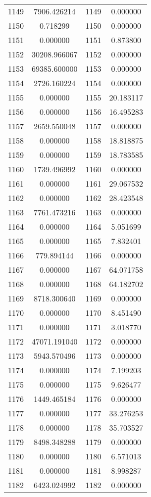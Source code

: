 \documentclass[12pt]{article}
\begin{document}
\begin{longtable}{@{}cccc@{}}
1149 & 7906.426214 & 1149 & 0.000000 \\
1150 & 0.718299 & 1150 & 0.000000 \\
1151 & 0.000000 & 1151 & 0.873800 \\
1152 & 30208.966067 & 1152 & 0.000000 \\
1153 & 69385.600000 & 1153 & 0.000000 \\
1154 & 2726.160224 & 1154 & 0.000000 \\
1155 & 0.000000 & 1155 & 20.183117 \\
1156 & 0.000000 & 1156 & 16.495283 \\
1157 & 2659.550048 & 1157 & 0.000000 \\
1158 & 0.000000 & 1158 & 18.818875 \\
1159 & 0.000000 & 1159 & 18.783585 \\
1160 & 1739.496992 & 1160 & 0.000000 \\
1161 & 0.000000 & 1161 & 29.067532 \\
1162 & 0.000000 & 1162 & 28.423548 \\
1163 & 7761.473216 & 1163 & 0.000000 \\
1164 & 0.000000 & 1164 & 5.051699 \\
1165 & 0.000000 & 1165 & 7.832401 \\
1166 & 779.894144 & 1166 & 0.000000 \\
1167 & 0.000000 & 1167 & 64.071758 \\
1168 & 0.000000 & 1168 & 64.182702 \\
1169 & 8718.300640 & 1169 & 0.000000 \\
1170 & 0.000000 & 1170 & 8.451490 \\
1171 & 0.000000 & 1171 & 3.018770 \\
1172 & 47071.191040 & 1172 & 0.000000 \\
1173 & 5943.570496 & 1173 & 0.000000 \\
1174 & 0.000000 & 1174 & 7.199203 \\
1175 & 0.000000 & 1175 & 9.626477 \\
1176 & 1449.465184 & 1176 & 0.000000 \\
1177 & 0.000000 & 1177 & 33.276253 \\
1178 & 0.000000 & 1178 & 35.703527 \\
1179 & 8498.348288 & 1179 & 0.000000 \\
1180 & 0.000000 & 1180 & 6.571013 \\
1181 & 0.000000 & 1181 & 8.998287 \\
1182 & 6423.024992 & 1182 & 0.000000 \\

\end{longtable}
\end{document}
